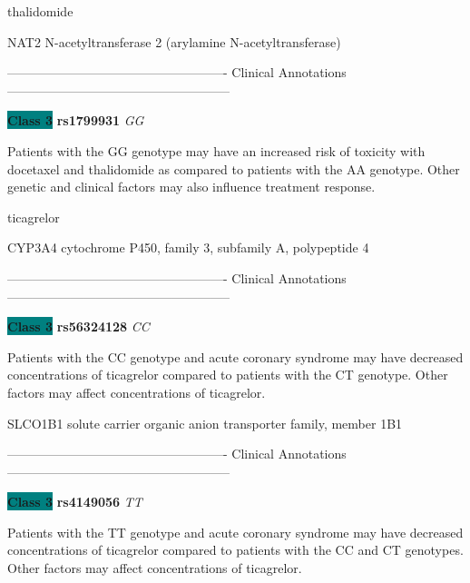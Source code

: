 \documentclass{resume} %
\begin{document}
\begin{rSection}{ thalidomide }
\begin{rSubsection}{ NAT2 }{ N-acetyltransferase 2 (arylamine N-acetyltransferase) }{}{}
\item[] ---------------------------------------------------- Clinical Annotations -----------------------------------------------------\newline
\item \textbf{\colorbox{teal} {Class 3}} \textbf{ rs1799931 } \textit{ GG }
\item[] Patients with the GG genotype may have an increased risk of toxicity with docetaxel and thalidomide as compared to patients with the AA genotype. Other genetic and clinical factors may also influence treatment response.
\end{rSubsection}

\end{rSection}\begin{rSection}{ ticagrelor }
\item[]

\begin{rSubsection}{ CYP3A4 }{ cytochrome P450, family 3, subfamily A, polypeptide 4 }{}{}
\item[]

\item[] ---------------------------------------------------- Clinical Annotations -----------------------------------------------------\newline
\item \textbf{\colorbox{teal} {Class 3}} \textbf{ rs56324128 } \textit{ CC }
\item[] Patients with the CC genotype and acute coronary syndrome may have decreased concentrations of ticagrelor compared to patients with the CT genotype. Other factors may affect concentrations of ticagrelor.
\end{rSubsection}\begin{rSubsection}{ SLCO1B1 }{ solute carrier organic anion transporter family, member 1B1 }{}{}
\item[]

\item[] ---------------------------------------------------- Clinical Annotations -----------------------------------------------------\newline
\item \textbf{\colorbox{teal} {Class 3}} \textbf{ rs4149056 } \textit{ TT }
\item[] Patients with the TT genotype and acute coronary syndrome may have decreased concentrations of ticagrelor compared to patients with the CC and CT genotypes. Other factors may affect concentrations of ticagrelor.
\end{rSubsection}


\end{rSection}
\end{document}
